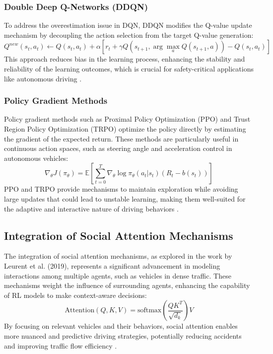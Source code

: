 \documentclass{article}
\begin{document}
\subsubsection{Double Deep Q-Networks (DDQN)}
To address the overestimation issue in DQN, DDQN modifies the Q-value update mechanism by decoupling the action selection from the target Q-value generation:
\[
Q^{new}(s_t, a_t) \leftarrow Q(s_t, a_t) + \alpha \left[r_t + \gamma Q(s_{t+1}, \arg\max_{a}Q(s_{t+1}, a)) - Q(s_t, a_t)\right]
\]
This approach reduces bias in the learning process, enhancing the stability and reliability of the learning outcomes, which is crucial for safety-critical applications like autonomous driving \citep{8500630}.

\subsubsection{Policy Gradient Methods}
Policy gradient methods such as Proximal Policy Optimization (PPO) and Trust Region Policy Optimization (TRPO) optimize the policy directly by estimating the gradient of the expected return. These methods are particularly useful in continuous action spaces, such as steering angle and acceleration control in autonomous vehicles:
\[
\nabla_{\theta} J(\pi_{\theta}) = \mathbb{E}\left[\sum_{t=0}^{T} \nabla_{\theta} \log \pi_{\theta}(a_t|s_t) (R_t - b(s_t))\right]
\]
PPO and TRPO provide mechanisms to maintain exploration while avoiding large updates that could lead to unstable learning, making them well-suited for the adaptive and interactive nature of driving behaviors \citep{7339478}.

\subsection{Integration of Social Attention Mechanisms}
The integration of social attention mechanisms, as explored in the work by Leurent et al. (2019), represents a significant advancement in modeling interactions among multiple agents, such as vehicles in dense traffic. These mechanisms weight the influence of surrounding agents, enhancing the capability of RL models to make context-aware decisions:
\[
\mathrm{Attention}(Q, K, V) = \mathrm{softmax}\left(\frac{QK^T}{\sqrt{d_k}}\right) V
\]
By focusing on relevant vehicles and their behaviors, social attention enables more nuanced and predictive driving strategies, potentially reducing accidents and improving traffic flow efficiency \citep{leurent2019social}.
\end{document}
